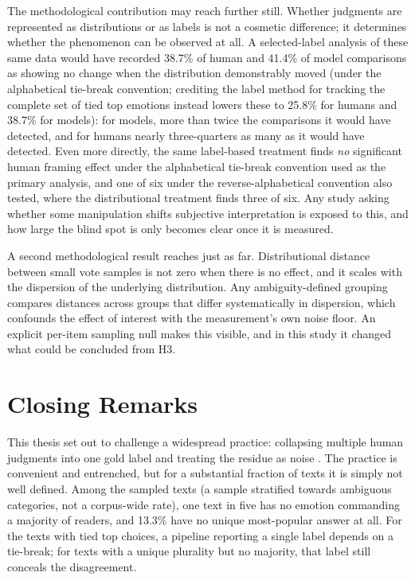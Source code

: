 The methodological contribution may reach further still. Whether judgments are represented as
distributions or as labels is not a cosmetic difference; it determines whether the phenomenon can
be observed at all. A selected-label analysis of these same data would have recorded 38.7\% of
human and 41.4\% of model comparisons as showing no change when the distribution demonstrably
moved (under the alphabetical tie-break convention; crediting the label method for tracking the
complete set of tied top emotions instead lowers these to 25.8\% for humans and 38.7\% for models):
for models, more than twice the comparisons it would have detected, and for humans nearly
three-quarters as many as it would have detected. Even more directly, the same label-based
treatment finds \emph{no} significant human framing effect under the alphabetical tie-break
convention used as the primary analysis, and one of six under the reverse-alphabetical convention
also tested, where the distributional treatment finds three of six. Any study asking whether some
manipulation shifts subjective interpretation is exposed to this, and how large the blind spot is
only becomes clear once it is measured.

A second methodological result reaches just as far. Distributional distance between small vote
samples is not zero when there is no effect, and it scales with the dispersion of the underlying
distribution. Any ambiguity-defined grouping compares distances across groups that differ
systematically in dispersion, which confounds the effect of interest with the measurement's own
noise floor. An explicit per-item sampling null makes this visible, and in this study it changed
what could be concluded from H3.

\section{Closing Remarks}
\label{conc:closing}

\noindent
This thesis set out to challenge a widespread practice: collapsing multiple human judgments into
one gold label and treating the residue as noise \cite{Basile2020GoldStandard,
Aroyo2015CrowdTruth}. The practice is convenient and entrenched, but for a substantial fraction of
texts it is simply not well defined. Among the sampled texts (a sample stratified towards ambiguous
categories, not a corpus-wide rate), one text in five has no emotion commanding a majority of
readers, and 13.3\% have no unique most-popular answer at all. For the texts with tied top
choices, a pipeline reporting a single label depends on a tie-break; for texts with a unique
plurality but no majority, that label still conceals the disagreement.

